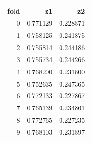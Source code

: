 \begin{tabular}{rrr}
\toprule
fold & z1 & z2 \\
\midrule
0 & 0.771129 & 0.228871 \\
1 & 0.758125 & 0.241875 \\
2 & 0.755814 & 0.244186 \\
3 & 0.755734 & 0.244266 \\
4 & 0.768200 & 0.231800 \\
5 & 0.752635 & 0.247365 \\
6 & 0.772133 & 0.227867 \\
7 & 0.765139 & 0.234861 \\
8 & 0.772765 & 0.227235 \\
9 & 0.768103 & 0.231897 \\
\bottomrule
\end{tabular}
